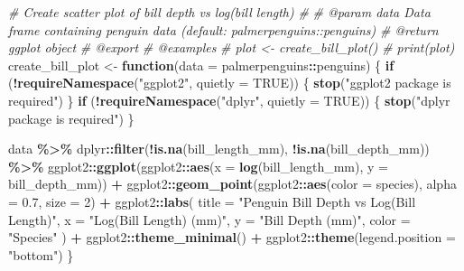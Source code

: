 \documentclass[
]{article}
\newenvironment{Shaded}{\begin{snugshade}}{\end{snugshade}}
\newcommand{\AttributeTok}[1]{\textcolor[rgb]{0.13,0.29,0.53}{#1}}
\newcommand{\CommentTok}[1]{\textcolor[rgb]{0.56,0.35,0.01}{\textit{#1}}}
\newcommand{\ConstantTok}[1]{\textcolor[rgb]{0.56,0.35,0.01}{#1}}
\newcommand{\ControlFlowTok}[1]{\textcolor[rgb]{0.13,0.29,0.53}{\textbf{#1}}}
\newcommand{\DecValTok}[1]{\textcolor[rgb]{0.00,0.00,0.81}{#1}}
\newcommand{\FloatTok}[1]{\textcolor[rgb]{0.00,0.00,0.81}{#1}}
\newcommand{\FunctionTok}[1]{\textcolor[rgb]{0.13,0.29,0.53}{\textbf{#1}}}
\newcommand{\NormalTok}[1]{#1}
\newcommand{\OtherTok}[1]{\textcolor[rgb]{0.56,0.35,0.01}{#1}}
\newcommand{\SpecialCharTok}[1]{\textcolor[rgb]{0.81,0.36,0.00}{\textbf{#1}}}
\newcommand{\StringTok}[1]{\textcolor[rgb]{0.31,0.60,0.02}{#1}}
\begin{document}
\begin{Shaded}
\begin{Highlighting}[]
\CommentTok{\#\textquotesingle{} Create scatter plot of bill depth vs log(bill length)}
\CommentTok{\#\textquotesingle{} }
\CommentTok{\#\textquotesingle{} @param data Data frame containing penguin data (default: palmerpenguins::penguins)}
\CommentTok{\#\textquotesingle{} @return ggplot object}
\CommentTok{\#\textquotesingle{} @export}
\CommentTok{\#\textquotesingle{} @examples}
\CommentTok{\#\textquotesingle{} plot \textless{}{-} create\_bill\_plot()}
\CommentTok{\#\textquotesingle{} print(plot)}
\NormalTok{create\_bill\_plot }\OtherTok{\textless{}{-}} \ControlFlowTok{function}\NormalTok{(}\AttributeTok{data =}\NormalTok{ palmerpenguins}\SpecialCharTok{::}\NormalTok{penguins) \{}
  \ControlFlowTok{if}\NormalTok{ (}\SpecialCharTok{!}\FunctionTok{requireNamespace}\NormalTok{(}\StringTok{"ggplot2"}\NormalTok{, }\AttributeTok{quietly =} \ConstantTok{TRUE}\NormalTok{)) \{}
    \FunctionTok{stop}\NormalTok{(}\StringTok{"ggplot2 package is required"}\NormalTok{)}
\NormalTok{  \}}
  \ControlFlowTok{if}\NormalTok{ (}\SpecialCharTok{!}\FunctionTok{requireNamespace}\NormalTok{(}\StringTok{"dplyr"}\NormalTok{, }\AttributeTok{quietly =} \ConstantTok{TRUE}\NormalTok{)) \{}
    \FunctionTok{stop}\NormalTok{(}\StringTok{"dplyr package is required"}\NormalTok{)}
\NormalTok{  \}}
  
\NormalTok{  data }\SpecialCharTok{\%\textgreater{}\%}
\NormalTok{    dplyr}\SpecialCharTok{::}\FunctionTok{filter}\NormalTok{(}\SpecialCharTok{!}\FunctionTok{is.na}\NormalTok{(bill\_length\_mm), }\SpecialCharTok{!}\FunctionTok{is.na}\NormalTok{(bill\_depth\_mm)) }\SpecialCharTok{\%\textgreater{}\%}
\NormalTok{    ggplot2}\SpecialCharTok{::}\FunctionTok{ggplot}\NormalTok{(ggplot2}\SpecialCharTok{::}\FunctionTok{aes}\NormalTok{(}\AttributeTok{x =} \FunctionTok{log}\NormalTok{(bill\_length\_mm), }\AttributeTok{y =}\NormalTok{ bill\_depth\_mm)) }\SpecialCharTok{+}
\NormalTok{    ggplot2}\SpecialCharTok{::}\FunctionTok{geom\_point}\NormalTok{(ggplot2}\SpecialCharTok{::}\FunctionTok{aes}\NormalTok{(}\AttributeTok{color =}\NormalTok{ species), }\AttributeTok{alpha =} \FloatTok{0.7}\NormalTok{, }\AttributeTok{size =} \DecValTok{2}\NormalTok{) }\SpecialCharTok{+}
\NormalTok{    ggplot2}\SpecialCharTok{::}\FunctionTok{labs}\NormalTok{(}
      \AttributeTok{title =} \StringTok{"Penguin Bill Depth vs Log(Bill Length)"}\NormalTok{,}
      \AttributeTok{x =} \StringTok{"Log(Bill Length) (mm)"}\NormalTok{,}
      \AttributeTok{y =} \StringTok{"Bill Depth (mm)"}\NormalTok{,}
      \AttributeTok{color =} \StringTok{"Species"}
\NormalTok{    ) }\SpecialCharTok{+}
\NormalTok{    ggplot2}\SpecialCharTok{::}\FunctionTok{theme\_minimal}\NormalTok{() }\SpecialCharTok{+}
\NormalTok{    ggplot2}\SpecialCharTok{::}\FunctionTok{theme}\NormalTok{(}\AttributeTok{legend.position =} \StringTok{"bottom"}\NormalTok{)}
\NormalTok{\}}
\end{Highlighting}
\end{Shaded}
\end{document}

